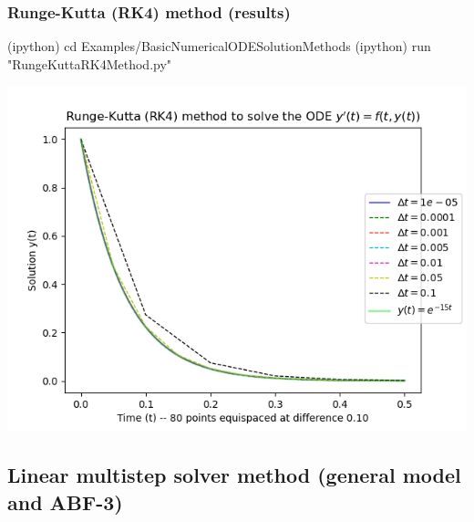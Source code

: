 \documentclass[usenames,svgnames,dvipsnames,10pt]{beamer}
\begin{document}
\begin{frame}[fragile]
\frametitle{Runge-Kutta (RK4) method (results)}

\begin{center}
\begin{code}
(ipython) cd Examples/BasicNumericalODESolutionMethods
(ipython) run "RungeKuttaRK4Method.py"
\end{code}
\vskip -0.075cm
\includegraphics[height=0.76\textheight]{../Images/RungeKuttaRK4-PlotOutputs-StepSizeHComparison-v2.png}
\end{center}

\end{frame}

\subsection{Linear multistep solver method (general model and ABF-3)}
\end{document}
